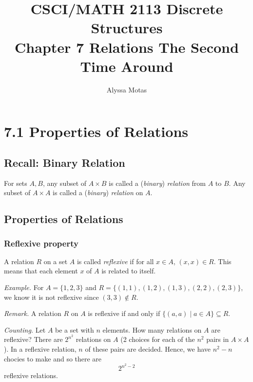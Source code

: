 \documentclass[11pt]{article}
\title{\textbf{CSCI/MATH 2113 Discrete Structures} \\ Chapter 7 Relations The Second Time Around}
\author{Alyssa Motas}
\begin{document}
    \maketitle

    \pagebreak

    \tableofcontents

    \pagebreak

    \section{7.1 Properties of Relations}

    \subsection{Recall: Binary Relation}

    For sets $A, B$, any subset of \(A \times B\) is called a (\emph{binary}) \emph{relation} from $A$ to $B$. Any subset of \(A \times A\) is called a (\emph{binary}) \emph{relation} on $A$.

    \subsection{Properties of Relations}

    \subsubsection{Reflexive property}

    A relation $R$ on a set $A$ is called \emph{reflexive} if for all \(x \in A\), \((x,x) \in R\). This means that each element $x$ of $A$ is related to itself. 

    \vspace{1em}

    \emph{Example.} For \(A = \{1,2,3\}\) and \(R = \{(1,1), (1,2), (1,3), (2,2), (2,3)\}\), we know it is not reflexive since \((3,3) \notin R\).

    \vspace{1em}

    \emph{Remark.} A relation $R$ on $A$ is reflexive if and only if \(\{(a,a) \mid a \in A\} \subseteq R\).

    \vspace{1em}

    \emph{Counting.} Let $A$ be a set with $n$ elements. How many relations on $A$ are reflexive? There are \(2^{n^2}\) relations on $A$ (2 choices for each of the $n^2$ pairs in $A \times A$). In a reflexive relation, $n$ of these pairs are decided. Hence, we have \(n^2 - n\) chocies to make and so there are  \[2^{n^2 - 2}\] reflexive relations.
\end{document}
